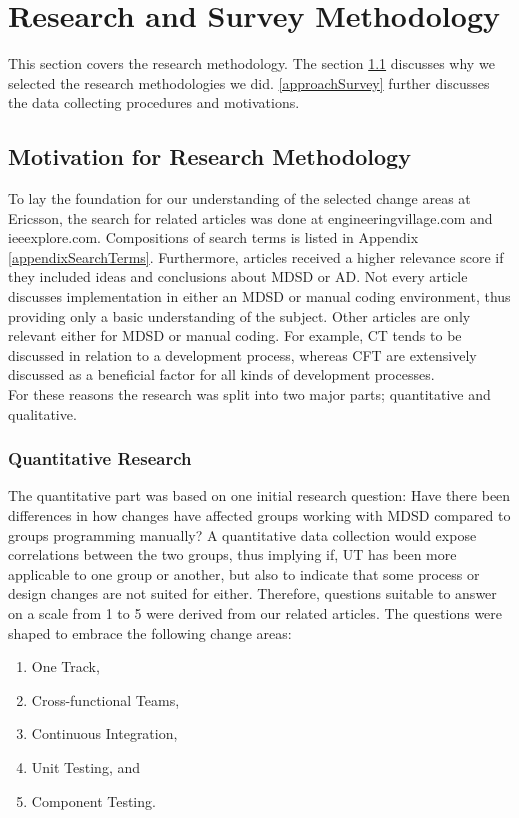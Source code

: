\documentclass[final_report_innit.tex]{subfiles}
\begin{document}
\section{Research and Survey Methodology}\label{approach}
This section covers the research methodology. The section \ref{approachChoice} discusses why we selected the research methodologies we did. \ref{approachSurvey} further discusses the data collecting procedures and motivations.


\subsection{Motivation for Research Methodology}\label{approachChoice}
To lay the foundation for our understanding of the selected change areas at Ericsson, the search for related articles was done at engineeringvillage.com and ieeexplore.com. Compositions of search terms is listed in Appendix \ref{appendixSearchTerms}. Furthermore, articles received a higher relevance score if they included ideas and conclusions about MDSD or AD. Not every article discusses implementation in either an MDSD or manual coding environment, thus providing only a basic understanding of the subject. Other articles are only relevant either for MDSD or manual coding. For example, CT tends to be discussed in relation to a development process, whereas CFT are extensively discussed as a beneficial factor for all kinds of development processes.
\\

For these reasons the research was split into two major parts; quantitative and qualitative.
\\

\subsubsection{Quantitative Research}\label{approachQuant}
The quantitative part was based on one initial research question: Have there been differences in how changes have affected groups working with MDSD compared to groups programming manually? A quantitative data collection would expose correlations between the two groups, thus implying if, UT has been more applicable to one group or another, but also to indicate that some process or design changes are not suited for either. Therefore, questions suitable to answer on a scale from 1 to 5 were derived from our related articles. The questions were shaped to embrace the following change areas:
\\
\begin{enumerate}
	\item One Track,
	\item Cross-functional Teams,
	\item Continuous Integration,
	\item Unit Testing, and
	\item Component Testing. \\ %
\end{enumerate}
\end{document}
